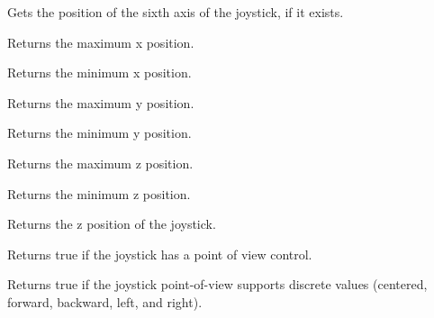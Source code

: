 Gets the position of the sixth axis of the joystick, if it exists.

\label{wxjoystickgetxmax}


Returns the maximum x position.

\label{wxjoystickgetxmin}


Returns the minimum x position.

\label{wxjoystickgetymax}


Returns the maximum y position.

\label{wxjoystickgetymin}


Returns the minimum y position.

\label{wxjoystickgetzmax}


Returns the maximum z position.

\label{wxjoystickgetzmin}


Returns the minimum z position.

\label{wxjoystickgetzposition}


Returns the z position of the joystick.

\label{wxjoystickhaspov}


Returns true if the joystick has a point of view control.

\label{wxjoystickhaspovfdir}


Returns true if the joystick point-of-view supports discrete values (centered, forward, backward, left, and right).

\label{wxjoystickhaspovcts}


